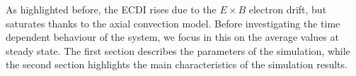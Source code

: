 As highlighted before, the \ac{ECDI} rises due to the $E \times B$ electron drift, but saturates thanks to the axial convection model.
Before investigating the time dependent behaviour of the system, we focus in this  on the average values at steady state.
The first section describes the parameters of the simulation, 
while the second section highlights the main characteristics of the simulation results.









